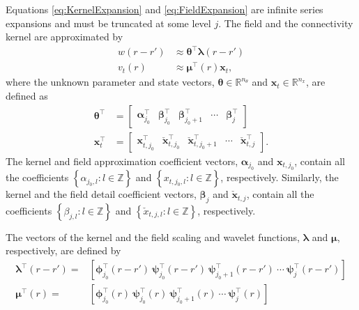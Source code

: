 \documentclass[11pt,draftcls,onecolumn,peerreview]{IEEEtran}
\begin{document}
Equations \ref{eq:KernelExpansion} and \ref{eq:FieldExpansion} are infinite series expansions and must be truncated at some level $j$. The field and the connectivity kernel are approximated by
\begin{align}
	w\left(r-r'\right) &\approx \boldsymbol\theta^\top\boldsymbol\lambda\left(r-r'\right) 
	\label{eq:KernelFiniteExpansion} \\
	v_t\left(r\right) &\approx \boldsymbol\mu^\top\left(r\right)\mathbf{x}_t,
	\label{eq:FieldFiniteExpansion}
\end{align}
where the unknown parameter and state vectors, $\boldsymbol\theta \in \mathbb{R}^{n_{\theta}}$ and $\mathbf{x}_t \in \mathbb{R}^{n_x}$, are defined as 
\begin{align}
\boldsymbol\theta^\top &=[\begin{array}{ccccc} \boldsymbol\alpha_{j_0}^\top & \boldsymbol\beta_{j_0}^\top & \boldsymbol\beta_{j_0+1}^\top & \cdots & \boldsymbol\beta_{j}^\top \end{array}] 
\label{KernelWeights} \\
\mathbf{x}_{t}^\top &=[\begin{array}{ccccc}\mathbf{x}_{t,j_{0}}^\top &  \check{\mathbf{x}}_{t,j_{0}}^\top & \check{\mathbf{x}}_{t,j_{0}+1}^\top & \cdots & \check{\mathbf{x}}_{t,j}^\top\end{array}].
\label{FieldWeights}
\end{align}
The kernel and field approximation coefficient vectors, $\boldsymbol \alpha_{j_0}$ and $\mathbf{x}_{t,j_{0}}$, contain all the coefficients $\left\lbrace\alpha_{j_0, l}:l \in \mathbb{Z} \right\rbrace $ and $\left\lbrace x_{t,j_0, l}: l \in \mathbb{Z}\right\rbrace$, respectively. Similarly, the kernel and the field detail coefficient vectors, $\boldsymbol\beta_{j}$ and $\check{\mathbf{x}}_{t,j}$, contain all the coefficients $\left\lbrace \beta_{j,l} :l \in \mathbb{Z}\right\rbrace$ and $\left\lbrace  \check x_{t,j, l}:l \in \mathbb{Z}\right\rbrace$, respectively.

The vectors of the kernel and the field scaling and wavelet functions, $\boldsymbol\lambda$ and $\boldsymbol\mu$, respectively, are defined by
\begin{align}
    \label{KernelBasisVector}
    \boldsymbol\lambda^\top(r-r')=&\left[
    \boldsymbol\phi_{j_0}^\top(r-r') ~
    \boldsymbol\psi_{j_0}^\top(r-r') ~ 
    \boldsymbol\psi_{j_0+1}^\top(r-r') ~
    \cdots ~
    \boldsymbol\psi_{j}^\top(r-r')\right] \\
    \label{FieldBasisVector}
    \boldsymbol\mu^\top (r) =& \left[
    \boldsymbol\phi_{j_0}^\top(r) ~ 
    \boldsymbol\psi_{j_0}^\top(r) ~ 
    \boldsymbol\psi_{j_0+1}^\top(r) ~ 
    \cdots ~ 
    \boldsymbol\psi_{j}^\top(r)
\right]   
\end{align}
\end{document}
